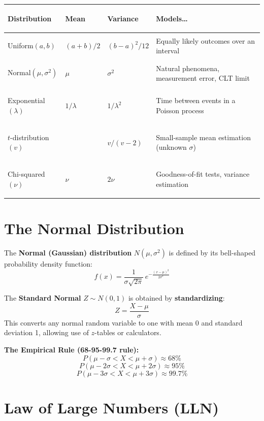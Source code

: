 \documentclass[11pt, letterpaper]{article}
\begin{document}
\noindent
{\small\renewcommand{\arraystretch}{1.7}
\begin{tabularx}{\textwidth}{>{\bfseries\raggedright\arraybackslash}p{3.2cm}
                              >{\centering\arraybackslash}p{1.8cm}
                              >{\centering\arraybackslash}p{1.8cm}
                              >{\raggedright\arraybackslash}X}
\toprule
\rowcolor{tableheadergreen}
\textbf{Distribution} & \textbf{Mean} & \textbf{Variance} & \textbf{Models\ldots} \\
\midrule
\rowcolor{rowA}  Uniform$(a,b)$       & $(a+b)/2$ & $(b-a)^2/12$ & Equally likely outcomes over an interval \\
\rowcolor{rowBg} Normal$(\mu, \sigma^2)$ & $\mu$ & $\sigma^2$ & Natural phenomena, measurement error, CLT limit \\
\rowcolor{rowA}  Exponential$(\lambda)$ & $1/\lambda$ & $1/\lambda^2$ & Time between events in a Poisson process \\
\rowcolor{rowBg} $t$-distribution$(v)$  & 0 & $v/(v-2)$ & Small-sample mean estimation (unknown $\sigma$) \\
\rowcolor{rowA}  Chi-squared$(\nu)$     & $\nu$ & $2\nu$ & Goodness-of-fit tests, variance estimation \\
\bottomrule
\end{tabularx}}

\section*{The Normal Distribution}

The \textbf{Normal (Gaussian) distribution} $N(\mu, \sigma^2)$ is defined by its bell-shaped probability density function:
\[
  f(x) = \frac{1}{\sigma\sqrt{2\pi}}\, e^{-\frac{(x-\mu)^2}{2\sigma^2}}
\]

The \textbf{Standard Normal} $Z \sim N(0,1)$ is obtained by \textbf{standardizing}:
\[
  Z = \frac{X - \mu}{\sigma}
\]
This converts any normal random variable to one with mean 0 and standard deviation 1, allowing use of $z$-tables or calculators.

\textbf{The Empirical Rule (68-95-99.7 rule):}
\[
  P(\mu - \sigma < X < \mu + \sigma) \approx 68\%
\]
\[
  P(\mu - 2\sigma < X < \mu + 2\sigma) \approx 95\%
\]
\[
  P(\mu - 3\sigma < X < \mu + 3\sigma) \approx 99.7\%
\]

\section*{Law of Large Numbers (LLN)}
\end{document}
